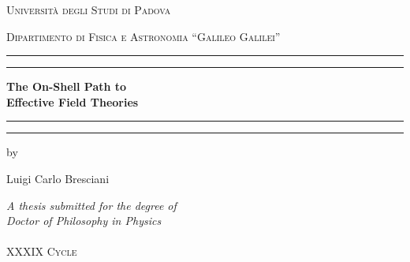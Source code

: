 \begin{titlepage}
    \centering

    

    \vspace{1\baselineskip}

    {\LARGE\scshape Università degli Studi di Padova}

    \vspace{0.5\baselineskip}

    {\Large\scshape Dipartimento di Fisica e Astronomia ``Galileo Galilei''}

    \vspace{1.5\baselineskip}

    \rule{\textwidth}{1.6pt}\vspace*{-\baselineskip}\vspace*{2pt}
    \rule{\textwidth}{0.4pt}

    \vspace{0.75\baselineskip}

    {\Huge\bfseries\fontsections
        The On-Shell Path to\\
        Effective Field Theories\\%
    }

    \vspace{0.75\baselineskip}

    \rule{\textwidth}{0.4pt}\vspace*{-\baselineskip}\vspace{3.2pt}
    \rule{\textwidth}{1.6pt}

    \vspace{1.5\baselineskip}

    by

    \vspace{0.75\baselineskip}

    {\fontsections\LARGE Luigi Carlo Bresciani}

    \vspace{2\baselineskip}

    {\large
        \textit{A thesis submitted for the degree of\\
        \emph{Doctor of Philosophy} in \emph{Physics}}%
        \\~\\
        {\scshape XXXIX Cycle}
    }


\end{titlepage}
